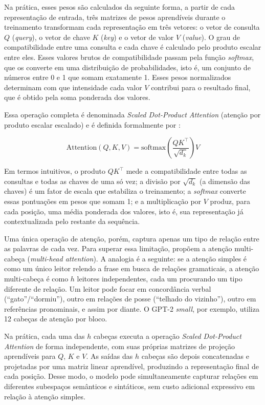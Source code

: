 Na prática, esses pesos são calculados da seguinte forma, a partir de cada representação
de entrada, três matrizes de pesos aprendíveis durante o treinamento transformam cada
representação em três vetores: o vetor de consulta $Q$ (\textit{query}), o vetor de
chave $K$ (\textit{key}) e o vetor de valor $V$ (\textit{value}). O grau de compatibilidade
entre uma consulta e cada chave é calculado pelo produto escalar entre eles. Esses valores
brutos de compatibilidade passam pela função \textit{softmax}, que os converte em uma
distribuição de probabilidades, isto é, um conjunto de números entre 0 e 1 que somam
exatamente 1. Esses pesos normalizados determinam com que intensidade cada valor $V$
contribui para o resultado final, que é obtido pela soma ponderada dos valores.

Essa operação completa é denominada \textit{Scaled Dot-Product Attention} (atenção por
produto escalar escalado) e é definida formalmente por \cite{Vaswani2017}:

\[
    \text{Attention}(Q, K, V) = \text{softmax}\!\left(\frac{QK^\top}{\sqrt{d_k}}\right) V
\]

Em termos intuitivos, o produto $QK^\top$ mede a compatibilidade entre todas as consultas e
todas as chaves de uma só vez; a divisão por $\sqrt{d_k}$ (a dimensão das chaves) é um fator
de escala que estabiliza o treinamento; a \textit{softmax} converte essas pontuações em
pesos que somam 1; e a multiplicação por $V$ produz, para cada posição, uma média ponderada
dos valores, isto é, sua representação já contextualizada pelo restante da sequência.

Uma única operação de atenção, porém, captura apenas um tipo de relação entre as palavras
de cada vez. Para superar essa limitação,  propõem a atenção
multi-cabeça (\textit{multi-head attention}). A analogia é a seguinte: se a atenção
simples é como um único leitor relendo a frase em busca de relações gramaticais, a atenção
multi-cabeça é como $h$ leitores independentes, cada um procurando um tipo diferente de
relação. Um leitor pode focar em concordância verbal (``gato''/``dormiu''), outro em
relações de posse (``telhado do vizinho''), outro em referências pronominais, e assim por
diante. O GPT-2 \textit{small}, por exemplo, utiliza 12 cabeças de atenção por bloco.

Na prática, cada uma das $h$ cabeças executa a operação \textit{Scaled Dot-Product
Attention} de forma independente, com suas próprias matrizes de projeção aprendíveis para
$Q$, $K$ e $V$. As saídas das $h$ cabeças são depois concatenadas e projetadas por uma
matriz linear aprendível, produzindo a representação final de cada posição. Desse modo,
o modelo pode simultaneamente capturar relações em diferentes subespaços semânticos e
sintáticos, sem custo adicional expressivo em relação à atenção simples.

